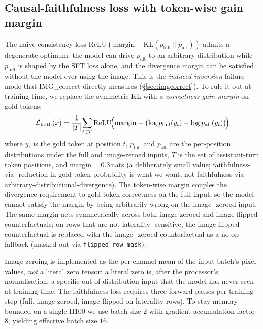 \documentclass{article}
\begin{document}
\subsection{Causal-faithfulness loss with token-wise gain margin}
\label{sec:faith}

The naive consistency loss
$\mathrm{ReLU}(\text{margin} - \mathrm{KL}(p_{\mathrm{full}} \| p_{\mathrm{alt}}))$
admits a degenerate optimum: the model can drive $p_{\mathrm{alt}}$ to an
arbitrary distribution while $p_{\mathrm{full}}$ is shaped by the SFT loss
alone, and the divergence margin can be satisfied without the model ever
using the image. This is the \emph{induced inversion} failure mode that
IMG\_correct directly measures (\S\ref{sec:imgcorrect}). To rule it out at
training time, we replace the symmetric KL with a \emph{correctness-gain
margin} on gold tokens:
\begin{equation}
\mathcal{L}_{\mathrm{faith}}(x) =
\frac{1}{|T|}\!\sum_{t \in T}\mathrm{ReLU}\!\Bigl(
\text{margin} - \bigl(\log p_{\mathrm{full}}(y_t) - \log p_{\mathrm{alt}}(y_t)\bigr)\!\Bigr)
\end{equation}
where $y_t$ is the gold token at position $t$, $p_{\mathrm{full}}$ and
$p_{\mathrm{alt}}$ are the per-position distributions under the full and
image-zeroed inputs, $T$ is the set of assistant-turn token positions, and
$\text{margin} = 0.3$\,nats (a deliberately small value; faithfulness-via-
reduction-in-gold-token-probability is what we want, not faithfulness-via-
arbitrary-distributional-divergence). The token-wise margin couples the
divergence requirement to gold-token correctness on the full input, so the
model cannot satisfy the margin by being arbitrarily wrong on the image-
zeroed input. The same margin acts symmetrically across both image-zeroed
and image-flipped counterfactuals; on rows that are not laterality-
sensitive, the image-flipped counterfactual is replaced with the image-
zeroed counterfactual as a no-op fallback (masked out via
\texttt{flipped\_row\_mask}).

Image-zeroing is implemented as the per-channel mean of the input batch's
pixel values, \emph{not} a literal zero tensor: a literal zero is, after
the processor's normalisation, a specific out-of-distribution input that
the model has never seen at training time. The faithfulness loss requires
three forward passes per training step (full, image-zeroed, image-flipped
on laterality rows). To stay memory-bounded on a single H100 we use
batch size $2$ with gradient-accumulation factor $8$, yielding effective
batch size $16$.
\end{document}
